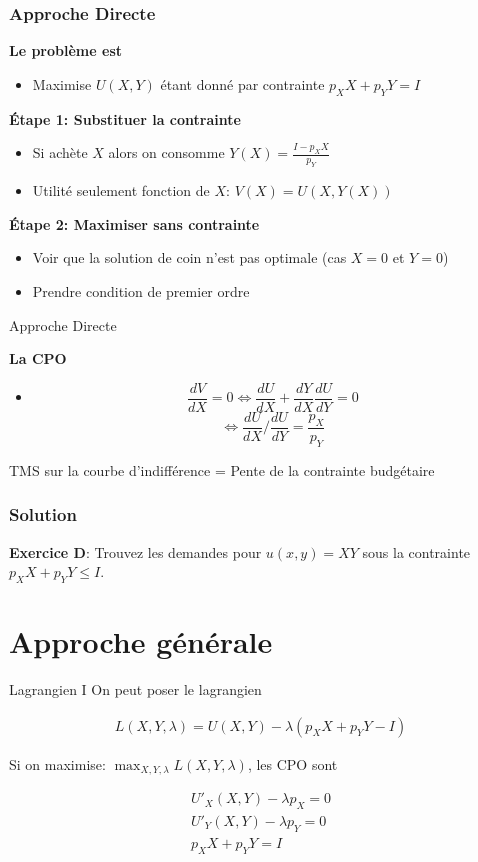 \documentclass[handout]{beamer}
\begin{document}
\begin{frame}\frametitle{Approche Directe}

\textbf{Le problème est}
\begin{itemize}
\item Maximise $U(X,Y)$ étant donné par contrainte $p_X X+ p_YY = I$
\end{itemize}

\pause
\textbf{Étape 1: Substituer la contrainte}
\begin{itemize}
\item Si achète $X$ alors on consomme $Y(X) = \frac{I - p_X X}{p_Y}$
\item Utilité seulement fonction de $X$: $V(X) = U(X,Y(X))$
\end{itemize}

\pause

\textbf{Étape 2: Maximiser sans contrainte}
\begin{itemize}
\item Voir que la solution de coin n'est pas optimale (cas $X= 0$ et $Y=0$)
\item Prendre condition de premier ordre 
\end{itemize}
\end{frame}

\begin{frame}{Approche Directe}

\textbf{La CPO}
\begin{itemize}
\item $$\frac{dV}{dX} = 0 \iff \frac{dU}{dX} + \frac{dY}{dX}\frac{dU}{dY} = 0$$
 $$\iff \frac{dU}{dX}\Bigg/\frac{dU}{dY} = \frac{p_X}{p_Y}$$
\end{itemize}
TMS sur la courbe d'indifférence = Pente de la contrainte budgétaire
\end{frame}

\begin{frame}\frametitle{Solution}

\textbf{Exercice D}: Trouvez les demandes pour $u(x,y) = XY$ sous la contrainte $p_X X + p_Y Y \le I $. 
\end{frame}

\section{Approche générale}

\begin{frame}{Lagrangien I}
On peut poser le lagrangien

\begin{align*}
L(X,Y,\lambda) = U(X,Y) - \lambda (p_X X + p_Y Y - I)
\end{align*}

\pause

Si on maximise: $\max_{X,Y,\lambda} L(X,Y,\lambda)$, les CPO sont

\pause

\begin{align*}
U'_X(X,Y) - \lambda p_X = 0 \\
U'_Y(X,Y) - \lambda p_Y = 0 \\
p_X X + p_Y Y = I
\end{align*}
\end{frame}
\end{document}
